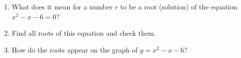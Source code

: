 \begin{enumerate}
\item[(a)] What does it mean for a number $r$ to be a root (solution) of the equation $x^2-x-6=0$?
\item[(b)] Find all roots of this equation and check them.
\item[(c)] How do the roots appear on the graph of $y=x^2-x-6$?
\end{enumerate}
